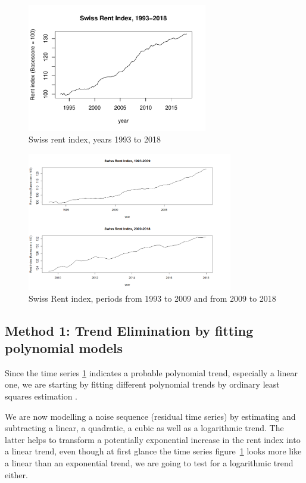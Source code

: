 \documentclass[11pt,a4paper]{article}
\begin{document}
\begin{figure}
    \centering
    \includegraphics[angle=0,width=0.7\textwidth]{indiceloyers_timeseries}
    \caption{Swiss rent index, years 1993 to 2018}
    \label{fig:indiceloyers_timeseries}
\end{figure}
 
\begin{figure}
    \centering
    \includegraphics[angle=0,width=0.8\textwidth]{indiceloyers_test_train}
    \caption{Swiss Rent index, periods from 1993 to 2009 and from 2009 to 2018}
    \label{fig:indiceloyers_test_train}
\end{figure}


\subsection{Method 1: Trend Elimination by fitting polynomial models}

Since the time series \ref{fig:indiceloyers_timeseries} indicates a probable polynomial trend, especially a linear one, we are starting by fitting different polynomial trends by ordinary least squares estimation \cite[p.~11]{htf09}.

We are now modelling a noise sequence (residual time series) by estimating and subtracting a linear, a quadratic, a cubic as well as a logarithmic trend.
The latter  helps to transform a potentially exponential increase in the rent index into a linear trend, even though at first glance the time series figure~\ref{fig:indiceloyers_timeseries} looks more like a linear than an exponential trend, we are going to test for a logarithmic trend either.
\end{document}
